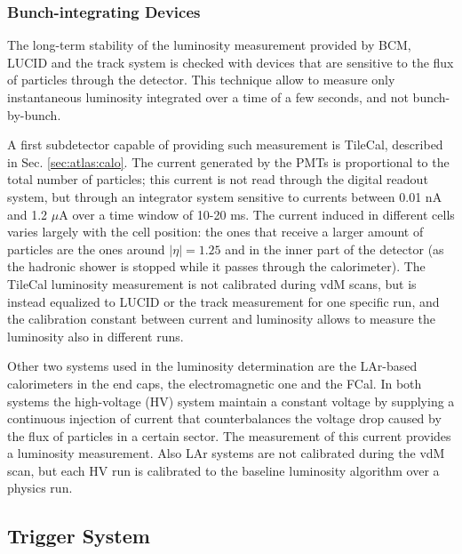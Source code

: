 \subsubsection*{Bunch-integrating Devices}

The long-term stability of the luminosity measurement provided by BCM, LUCID and the track system is checked with devices that are sensitive to the flux of particles through the detector. This technique allow to measure only instantaneous luminosity integrated over a time of a few seconds, and not bunch-by-bunch.

A first subdetector capable of providing such measurement is TileCal, described in Sec. \ref{sec:atlas:calo}. The current generated by the PMTs is proportional to the total number of particles; this current is not read through the digital readout system, but through an integrator system sensitive to currents between 0.01 nA and 1.2 $\mu$A over a time window of 10-20 ms. The current induced in different cells varies largely with the cell position: the ones that receive a larger amount of particles are the ones around $|\eta|=1.25$ and in the inner part of the detector (as the hadronic shower is stopped while it passes through the calorimeter). The TileCal luminosity measurement is not calibrated during vdM scans, but is instead equalized to LUCID or the track measurement for one specific run, and the calibration constant between current and luminosity allows to measure the luminosity also in different runs.

Other two systems used in the luminosity determination are the LAr-based calorimeters in the end caps, the electromagnetic one and the FCal. In both systems the high-voltage (HV) system maintain a constant voltage by supplying a continuous injection of current that counterbalances the voltage drop caused by the flux of particles in a certain sector. The measurement of this current provides a luminosity measurement. Also LAr systems are not calibrated during the vdM scan, but each HV run is calibrated to the baseline luminosity algorithm over a physics run.  


\subsection{Trigger System}
\label{sec:cern:trigger}


